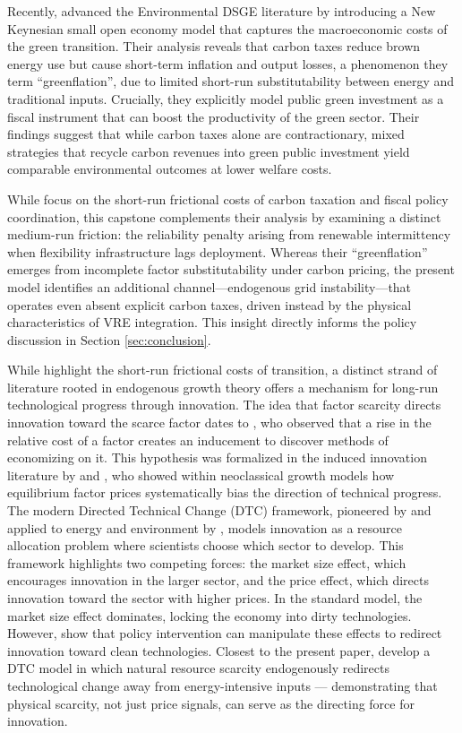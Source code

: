 \documentclass[12pt, a4paper]{article}
\begin{document}
Recently, \citet{airaudo2025green} advanced the Environmental DSGE literature by introducing a New Keynesian small open economy model that captures the macroeconomic costs of the green transition. Their analysis reveals that carbon taxes reduce brown energy use but cause short-term inflation and output losses, a phenomenon they term ``greenflation'', due to limited short-run substitutability between energy and traditional inputs. Crucially, they explicitly model public green investment as a fiscal instrument that can boost the productivity of the green sector. Their findings suggest that while carbon taxes alone are contractionary, mixed strategies that recycle carbon revenues into green public investment yield comparable environmental outcomes at lower welfare costs. 

While \citet{airaudo2025green} focus on the short-run frictional costs of carbon taxation and fiscal policy coordination, this capstone complements their analysis by examining a distinct medium-run friction: the reliability penalty arising from renewable intermittency when flexibility infrastructure lags deployment. Whereas their ``greenflation'' emerges from incomplete factor substitutability under carbon pricing, the present model identifies an additional channel---endogenous grid instability---that operates even absent explicit carbon taxes, driven instead by the physical characteristics of VRE integration. This insight directly informs the policy discussion in Section \ref{sec:conclusion}.

While \citet{airaudo2025green} highlight the short-run frictional costs of transition, a distinct strand of literature rooted in endogenous growth theory offers a mechanism for long-run technological progress through innovation. The idea that factor scarcity directs innovation toward the scarce factor dates to \citet{hicks1932}, who observed that a rise in the relative cost of a factor creates an inducement to discover methods of economizing on it. This hypothesis was formalized in the induced innovation literature by \citet{kennedy1964} and \citet{drandakisphelps1966}, who showed within neoclassical growth models how equilibrium factor prices systematically bias the direction of technical progress. The modern Directed Technical Change (DTC) framework, pioneered by \citet{acemoglu2002} and applied to energy and environment by \citet{acemoglu2012environment}, models innovation as a resource allocation problem where scientists choose which sector to develop. This framework highlights two competing forces: the market size effect, which encourages innovation in the larger sector, and the price effect, which directs innovation toward the sector with higher prices. In the standard model, the market size effect dominates, locking the economy into dirty technologies. However, \citet{acemoglu2012environment} show that policy intervention can manipulate these effects to redirect innovation toward clean technologies. Closest to the present paper, \citet{hassler2021} develop a DTC model in which natural resource scarcity endogenously redirects technological change away from energy-intensive inputs --- demonstrating that physical scarcity, not just price signals, can serve as the directing force for innovation.
\end{document}
